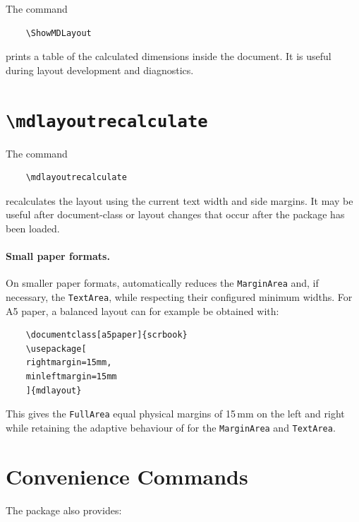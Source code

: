\documentclass[
11pt,
a4paper,
oneside
]{scrbook}
\begin{document}
The command
\begin{verbatim}
	\ShowMDLayout
\end{verbatim}
prints a table of the calculated dimensions inside the document.
It is useful during layout development and diagnostics.

\section{\texttt{\textbackslash mdlayoutrecalculate}}

The command
\begin{verbatim}
	\mdlayoutrecalculate
\end{verbatim}
recalculates the layout using the current text width and side margins.
It may be useful after document-class or layout changes that occur after the
package has been loaded.

\paragraph{Small paper formats.}
On smaller paper formats, \mdlayout{} automatically reduces the
\texttt{MarginArea} and, if necessary, the \texttt{TextArea}, while
respecting their configured minimum widths.
For A5 paper, a balanced layout can for example be obtained with:
\begin{verbatim}
	\documentclass[a5paper]{scrbook}
	\usepackage[
	rightmargin=15mm,
	minleftmargin=15mm
	]{mdlayout}
\end{verbatim}
This gives the \texttt{FullArea} equal physical margins of 15\,mm on
the left and right while retaining the adaptive behaviour of
\mdlayout{} for the \texttt{MarginArea} and \texttt{TextArea}.

\section{Convenience Commands}

The package also provides:

\newcommand*{\cmdsyntax}[1]{%
	\texttt{\detokenize{#1}}%
}
\end{document}
